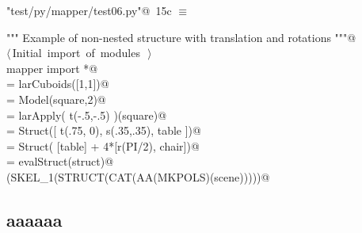 \documentclass[11pt,oneside]{article}	%
\begin{document}
\begin{flushleft} \small \label{scrap32}
\protect{}\verb@"test/py/mapper/test06.py"@\nobreak\ {\footnotesize 15c }$\equiv$
\vspace{-1ex}
\begin{list}{}{} \item
\mbox{}\verb@""" Example of non-nested structure with translation and rotations """@\\
\mbox{}\verb@@\hbox{$\langle\,$Initial import of modules\nobreak\ {\footnotesize {}}$\,\rangle$}\verb@@\\
\mbox{}\verb@from mapper import *@\\
\mbox{}\verb@square = larCuboids([1,1])@\\
\mbox{}\verb@square = Model(square,2)@\\
\mbox{}\verb@table = larApply( t(-.5,-.5) )(square)@\\
\mbox{}\verb@chair = Struct([ t(.75, 0), s(.35,.35), table ])@\\
\mbox{}\verb@struct = Struct( [table] + 4*[r(PI/2), chair])@\\
\mbox{}\verb@scene = evalStruct(struct)@\\
\mbox{}\verb@VIEW(SKEL_1(STRUCT(CAT(AA(MKPOLS)(scene)))))@\\
\mbox{}\verb@@{\NWsep}
\end{list}
\vspace{-2ex}
\end{flushleft}

\subsection{aaaaaa}
\end{document}
